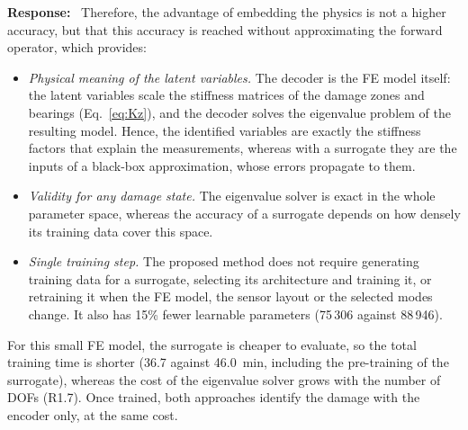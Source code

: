 \documentclass[11pt]{article}
\newenvironment{response}{\par\smallskip\noindent\color{resp}\textbf{Response:}\ }{\par}
\begin{document}
\begin{response}
Therefore, the advantage of embedding the physics is not a higher accuracy, but that this accuracy is reached without approximating the forward operator, which provides:
\begin{itemize}[leftmargin=*]
\item \emph{Physical meaning of the latent variables.} The decoder is the FE model itself: the latent variables scale the stiffness matrices of the damage zones and bearings (Eq.~\eqref{eq:Kz}), and the decoder solves the eigenvalue problem of the resulting model. Hence, the identified variables are exactly the stiffness factors that explain the measurements, whereas with a surrogate they are the inputs of a black-box approximation, whose errors propagate to them.
\item \emph{Validity for any damage state.} The eigenvalue solver is exact in the whole parameter space, whereas the accuracy of a surrogate depends on how densely its training data cover this space.
\item \emph{Single training step.} The proposed method does not require generating training data for a surrogate, selecting its architecture and training it, or retraining it when the FE model, the sensor layout or the selected modes change. It also has 15\% fewer learnable parameters (75\,306 against 88\,946).
\end{itemize}
For this small FE model, the surrogate is cheaper to evaluate, so the total training time is shorter (36.7 against 46.0~min, including the pre-training of the surrogate), whereas the cost of the eigenvalue solver grows with the number of DOFs (R1.7).
Once trained, both approaches identify the damage with the encoder only, at the same cost.


\end{response}
\end{document}
